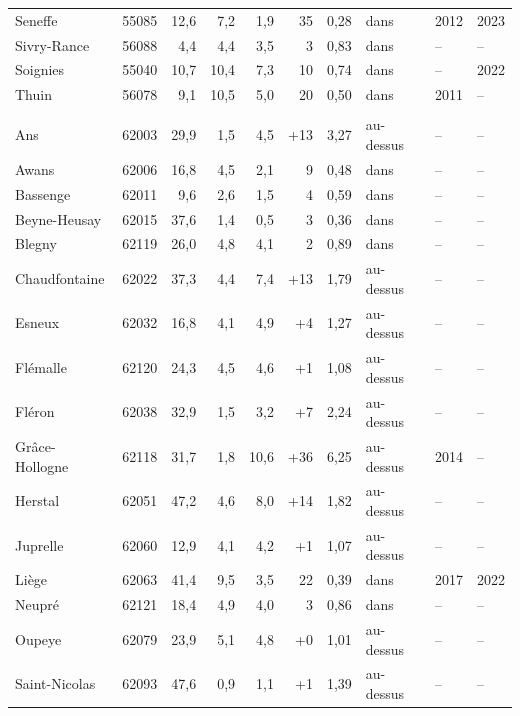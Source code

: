 \begin{longtable}{lrrrrrrlll}
Seneffe & 55085 & 12{,}6 & 7{,}2 & \textminus{}1{,}9 & \textminus{}35 & \textminus{}0{,}28 & dans & 2012 & 2023 \\
Sivry-Rance & 56088 & 4{,}4 & 4{,}4 & 3{,}5 & \textminus{}3 & 0{,}83 & dans & -- & -- \\
Soignies & 55040 & 10{,}7 & 10{,}4 & 7{,}3 & \textminus{}10 & 0{,}74 & dans & -- & 2022 \\
Thuin & 56078 & 9{,}1 & 10{,}5 & 5{,}0 & \textminus{}20 & 0{,}50 & dans & 2011 & -- \\
\addlinespace
\multicolumn{10}{l}{\textbf{Liège 1} (20 communes)} \\
Ans & 62003 & 29{,}9 & 1{,}5 & 4{,}5 & +13 & 3{,}27 & au-dessus & -- & -- \\
Awans & 62006 & 16{,}8 & 4{,}5 & 2{,}1 & \textminus{}9 & 0{,}48 & dans & -- & -- \\
Bassenge & 62011 & 9{,}6 & 2{,}6 & 1{,}5 & \textminus{}4 & 0{,}59 & dans & -- & -- \\
Beyne-Heusay & 62015 & 37{,}6 & 1{,}4 & 0{,}5 & \textminus{}3 & 0{,}36 & dans & -- & -- \\
Blegny & 62119 & 26{,}0 & 4{,}8 & 4{,}1 & \textminus{}2 & 0{,}89 & dans & -- & -- \\
Chaudfontaine & 62022 & 37{,}3 & 4{,}4 & 7{,}4 & +13 & 1{,}79 & au-dessus & -- & -- \\
Esneux & 62032 & 16{,}8 & 4{,}1 & 4{,}9 & +4 & 1{,}27 & au-dessus & -- & -- \\
Flémalle & 62120 & 24{,}3 & 4{,}5 & 4{,}6 & +1 & 1{,}08 & au-dessus & -- & -- \\
Fléron & 62038 & 32{,}9 & 1{,}5 & 3{,}2 & +7 & 2{,}24 & au-dessus & -- & -- \\
Grâce-Hollogne & 62118 & 31{,}7 & 1{,}8 & 10{,}6 & +36 & 6{,}25 & au-dessus & 2014 & -- \\
Herstal & 62051 & 47{,}2 & 4{,}6 & 8{,}0 & +14 & 1{,}82 & au-dessus & -- & -- \\
Juprelle & 62060 & 12{,}9 & 4{,}1 & 4{,}2 & +1 & 1{,}07 & au-dessus & -- & -- \\
Liège & 62063 & 41{,}4 & 9{,}5 & 3{,}5 & \textminus{}22 & 0{,}39 & dans & 2017 & 2022 \\
Neupré & 62121 & 18{,}4 & 4{,}9 & 4{,}0 & \textminus{}3 & 0{,}86 & dans & -- & -- \\
Oupeye & 62079 & 23{,}9 & 5{,}1 & 4{,}8 & +0 & 1{,}01 & au-dessus & -- & -- \\
Saint-Nicolas & 62093 & 47{,}6 & 0{,}9 & 1{,}1 & +1 & 1{,}39 & au-dessus & -- & -- \\

\end{longtable}
